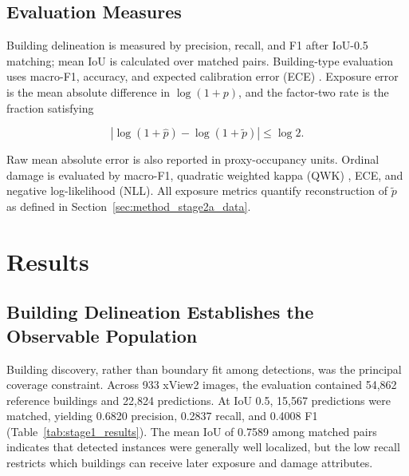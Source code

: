 \subsection{Evaluation Measures}
\label{sec:exp_metrics}

Building delineation is measured by precision, recall, and F1 after IoU-0.5 matching; mean IoU is calculated over matched pairs. Building-type evaluation uses macro-F1, accuracy, and expected calibration error (ECE) \citep{guo2017calibration}. Exposure error is the mean absolute difference in $\log(1+p)$, and the factor-two rate is the fraction satisfying

\begin{equation}
\left|\log(1+\widehat{p})-\log(1+\widetilde{p})\right| \leq \log 2.
\label{eq:factor_two}
\end{equation}

Raw mean absolute error is also reported in proxy-occupancy units. Ordinal damage is evaluated by macro-F1, quadratic weighted kappa (QWK) \citep{cohen1968weighted}, ECE, and negative log-likelihood (NLL). All exposure metrics quantify reconstruction of $\widetilde{p}$ as defined in Section~\ref{sec:method_stage2a_data}.

\section{Results}
\label{sec:results}

\subsection{Building Delineation Establishes the Observable Population}
\label{sec:exp_stage1}

Building discovery, rather than boundary fit among detections, was the principal coverage constraint. Across 933 xView2 images, the evaluation contained 54,862 reference buildings and 22,824 predictions. At IoU 0.5, 15,567 predictions were matched, yielding 0.6820 precision, 0.2837 recall, and 0.4008 F1 (Table~\ref{tab:stage1_results}). The mean IoU of 0.7589 among matched pairs indicates that detected instances were generally well localized, but the low recall restricts which buildings can receive later exposure and damage attributes.

